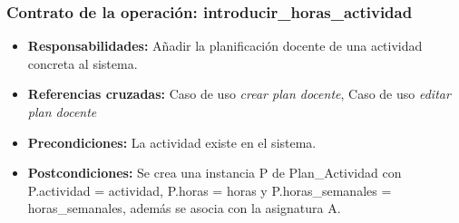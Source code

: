 \documentclass{book}
\begin{document}
\subsubsection{Contrato de la operación: introducir\_horas\_actividad}
\begin{itemize}
\item {\bf Responsabilidades:} Añadir la planificación docente de una actividad concreta al sistema.
\item {\bf Referencias cruzadas:} Caso de uso {\em crear plan docente}, Caso de uso {\em editar plan docente}
\item {\bf Precondiciones:} La actividad existe en el sistema.
\item {\bf Postcondiciones:} Se crea una instancia P de Plan\_Actividad con P.actividad = actividad, P.horas = horas y  P.horas\_semanales = horas\_semanales, además se asocia con la asignatura A.
\end{itemize}
\end{document}
